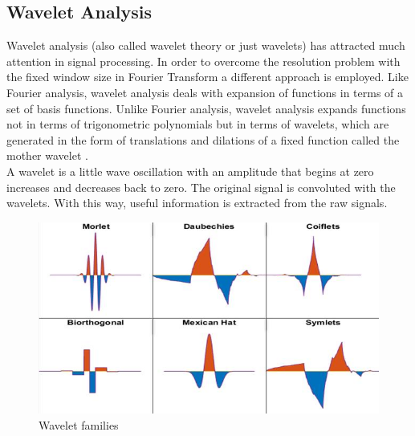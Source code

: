 \subsection{Wavelet Analysis}
Wavelet analysis (also called wavelet theory or just wavelets) has attracted much attention in signal processing. In order to overcome the resolution problem with the fixed window size in Fourier Transform a different approach is employed. Like Fourier analysis, wavelet analysis deals with expansion of functions in terms of a set of basis functions. Unlike Fourier analysis, wavelet analysis expands functions not in terms of trigonometric polynomials but in terms of wavelets, which are generated in the form of translations and dilations of a fixed function called the mother wavelet \cite{lee_wavelet_1994}. \\
A wavelet is a little wave oscillation with an amplitude that begins at zero increases and decreases back to zero. The original signal is convoluted with the wavelets. With this way, useful information is extracted from the raw signals. \\
\begin{figure}[H]
\includegraphics[width=13cm,center,keepaspectratio]{figures/wavelets}
\caption{Wavelet families \cite{fig:wavelets}}
\label{fig:wavelets}
\end{figure}
